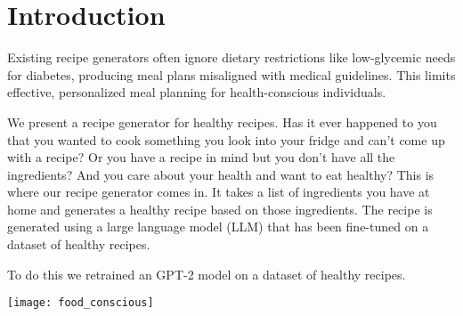 \section{Introduction}

Existing recipe generators often ignore dietary restrictions like low-glycemic needs for diabetes, producing meal plans misaligned with medical guidelines. This limits effective, personalized meal planning for health-conscious individuals.

We present a recipe generator for healthy recipes. Has it ever happened to you that you wanted to cook something you look into your fridge and can't come up with a recipe? Or you have a recipe in mind but you don't have all the ingredients? And you care about your health and want to eat healthy? This is where our recipe generator comes in. It takes a list of ingredients you have at home and generates a healthy recipe based on those ingredients. The recipe is generated using a large language model (LLM) that has been fine-tuned on a dataset of healthy recipes.

To do this we retrained an GPT-2 model on a dataset of healthy recipes.

\begin{center}
	\texttt{[image: food\_conscious]}
\end{center}